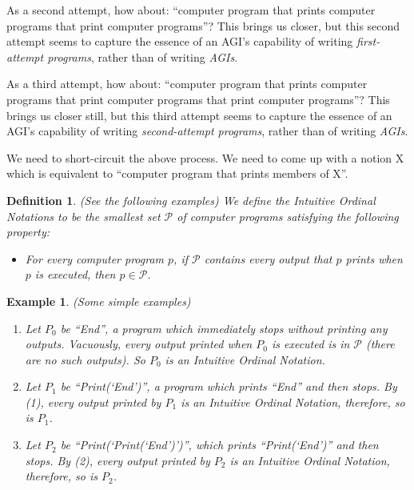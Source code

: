 \documentclass[runningheads]{llncs}
\newtheorem{myexample}[mytheorem]{Example}
\newtheorem{mydefinition}[mytheorem]{Definition}
\begin{document}
As a second attempt, how
about: ``computer program that prints computer programs that print
computer programs''? This brings us closer, but this second attempt
seems to capture the essence of an AGI's capability of writing \emph{first-attempt programs},
rather than of writing \emph{AGIs}.

As a third attempt, how about:
``computer program that prints computer programs that print computer programs
that print computer programs''? This brings us closer still, but this third
attempt seems to capture the essence of an AGI's capability of writing
\emph{second-attempt programs}, rather than of
writing \emph{AGIs}.

We need to short-circuit the above process. We need to come up with a notion
X which is equivalent to ``computer program that prints members of X''.

\begin{mydefinition}
\label{literalnotationdef}
    (See the following examples)
    We define the Intuitive Ordinal Notations to be the smallest set $\mathcal P$
    of computer programs satisfying the following property:
    \begin{itemize}
        \item
            For every computer program $p$,
            if $\mathcal P$ contains every output that $p$ prints when $p$ is executed,
            then $p\in\mathcal P$.
    \end{itemize}
\end{mydefinition}

\begin{myexample}
\label{simpleexamples}
(Some simple examples)
    \begin{enumerate}
    \item
    Let $P_0$ be ``End'', a program which immediately stops without printing any outputs.
    Vacuously, every output printed when $P_0$ is executed is in $\mathcal P$
    (there are no such outputs). So $P_0$ is an Intuitive Ordinal Notation.
    \item
    Let $P_1$ be ``Print(`End')'', a program which prints ``End'' and then
    stops. By (1), every output printed by $P_1$ is an Intuitive Ordinal Notation,
    therefore, so is $P_1$.
    \item
    Let $P_2$ be ``Print(`Print(`End')')'', which prints ``Print(`End')'' and then
    stops. By (2), every output printed by $P_2$ is an Intuitive Ordinal Notation,
    therefore, so is $P_2$.
    \end{enumerate}
\end{myexample}
\end{document}
